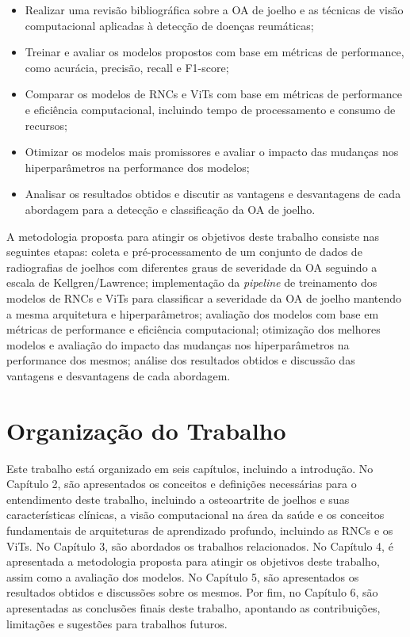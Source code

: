 \begin{itemize}
    \item Realizar uma revisão bibliográfica sobre a OA de joelho e as técnicas de visão computacional aplicadas à detecção de doenças reumáticas;
    \item Treinar e avaliar os modelos propostos com base em métricas de performance, como acurácia, precisão, recall e F1-score;
    \item Comparar os modelos de RNCs e ViTs com base em métricas de performance e eficiência computacional, incluindo tempo de processamento e consumo de recursos;
    \item Otimizar os modelos mais promissores e avaliar o impacto das mudanças nos hiperparâmetros na performance dos modelos;
    \item Analisar os resultados obtidos e discutir as vantagens e desvantagens de cada abordagem para a detecção e classificação da OA de joelho.
\end{itemize}

A metodologia proposta para atingir os objetivos deste trabalho consiste nas seguintes etapas: coleta e pré-processamento de um conjunto de dados de radiografias de joelhos com diferentes graus de severidade da OA seguindo a escala de Kellgren/Lawrence; implementação da \textit{pipeline} de treinamento dos modelos de RNCs e ViTs para classificar a severidade da OA de joelho mantendo a mesma arquitetura e hiperparâmetros; avaliação dos modelos com base em métricas de performance e eficiência computacional; otimização dos melhores modelos e avaliação do impacto das mudanças nos hiperparâmetros na performance dos mesmos; análise dos resultados obtidos e discussão das vantagens e desvantagens de cada abordagem.

\section{Organização do Trabalho}

Este trabalho está organizado em seis capítulos, incluindo a introdução. No Capítulo 2, são apresentados os conceitos e definições necessárias para o entendimento deste trabalho, incluindo a osteoartrite de joelhos e suas características clínicas, a visão computacional na área da saúde e os conceitos fundamentais de arquiteturas de aprendizado profundo, incluindo as RNCs e os ViTs. No Capítulo 3, são abordados os trabalhos relacionados. No Capítulo 4, é apresentada a metodologia proposta para atingir os objetivos deste trabalho, assim como a avaliação dos modelos. No Capítulo 5, são apresentados os resultados obtidos e discussões sobre os mesmos. Por fim, no Capítulo 6, são apresentadas as conclusões finais deste trabalho, apontando as contribuições, limitações e sugestões para trabalhos futuros.